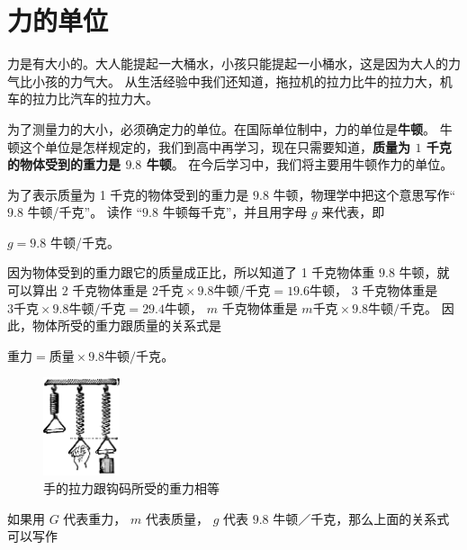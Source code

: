 \section{力的单位}\label{sec:2-3}

力是有大小的。大人能提起一大桶水，小孩只能提起一小桶水，这是因为大人的力气比小孩的力气大。
从生活经验中我们还知道，拖拉机的拉力比牛的拉力大，机车的拉力比汽车的拉力大。

为了测量力的大小，必须确定力的单位。在国际单位制中，力的单位是\textbf{牛顿}\footnotemark。
牛顿这个单位是怎样规定的，我们到高中再学习，现在只需要知道，\textbf{质量为 $1$ 千克的物体受到的重力是 $9.8$ 牛顿}。
在今后学习中，我们将主要用牛顿作力的单位。

为了表示质量为 1 千克的物体受到的重力是 $9.8$ 牛顿，物理学中把这个意思写作“$9.8$ 牛顿/千克”。
读作 “$9.8$ 牛顿每千克”\footnotemark，并且用字母 $g$ 来代表，即


\centerline{$g = 9.8$ 牛顿/千克。}

因为物体受到的重力跟它的质量成正比，所以知道了 1 千克物体重 $9.8$ 牛顿，就可以算出
$2$ 千克物体重是 $2\text{千克} \times 9.8 \text{牛顿/千克} = 19.6 \text{牛顿}$，
$3$ 千克物体重是 $3\text{千克} \times 9.8 \text{牛顿/千克} = 29.4 \text{牛顿}$，
$m$ 千克物体重是 $m\text{千克} \times 9.8 \text{牛顿/千克}$。
因此，物体所受的重力跟质量的关系式是

\centerline{$\text{重力} = \text{质量} \times 9.8 \text{牛顿/千克}$。}

\begin{figure}
    \centering
    \includegraphics[width=0.2\textwidth]{../pic/czwl1-ch2-6}
    \caption{手的拉力跟钩码所受的重力相等}\label{fig:2-6}
\end{figure}


如果用 $G$ 代表重力， $m$ 代表质量， $g$ 代表 $9.8$ 牛顿／千克，那么上面的关系式可以写作

